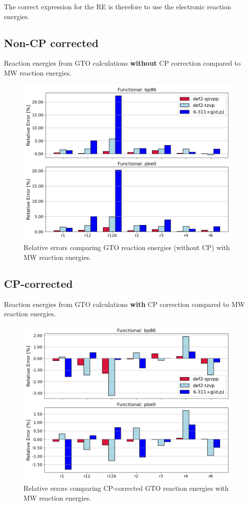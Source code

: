 \documentclass[11pt,a4paper]{article}
\begin{document}
The correct expression for the RE is therefore to use the electronic reaction energies.

	\subsection{Non-CP corrected}
	Reaction energies from GTO calculations \textbf{without} CP correction compared to MW reaction energies.
	\begin{figure}[H]
		\centering
		\includegraphics[width = \textwidth]{../figs/old_gto_vs_mw_noncp.png}
		\caption{Relative errors comparing GTO reaction energies (without CP) with MW reaction energies.}
		\label{fig: }
	\end{figure}

	\subsection{CP-corrected}
	Reaction energies from GTO calculations \textbf{with} CP correction compared to MW reaction energies.
	\begin{figure}[H]
		\centering
		\includegraphics[width = \textwidth]{../figs/old_gto_vs_mw_cp.png}
		\caption{Relative errors comparing CP-corrected GTO reaction energies with MW reaction energies.}
		\label{fig: }
	\end{figure}
\end{document}
